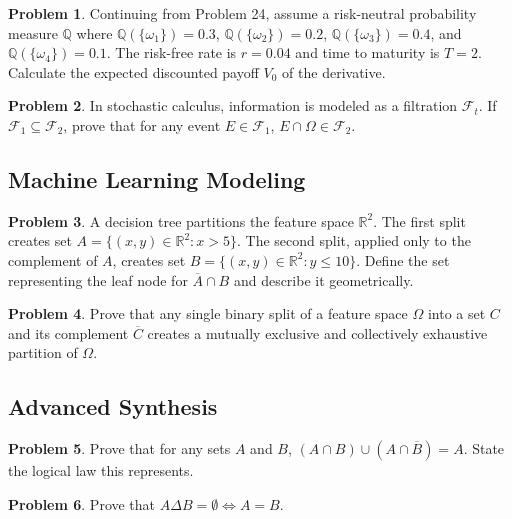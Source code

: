 \documentclass[12pt]{article}
\theoremstyle{definition}
\newtheorem{problem}{Problem}
\begin{document}
\begin{problem}
Continuing from Problem 24, assume a risk-neutral probability measure $\mathbb{Q}$ where $\mathbb{Q}(\{\omega_1\}) = 0.3$, $\mathbb{Q}(\{\omega_2\}) = 0.2$, $\mathbb{Q}(\{\omega_3\}) = 0.4$, and $\mathbb{Q}(\{\omega_4\}) = 0.1$. The risk-free rate is $r = 0.04$ and time to maturity is $T = 2$. Calculate the expected discounted payoff $V_0$ of the derivative.
\end{problem}

\begin{problem}
In stochastic calculus, information is modeled as a filtration $\mathcal{F}_t$. If $\mathcal{F}_1 \subseteq \mathcal{F}_2$, prove that for any event $E \in \mathcal{F}_1$, $E \cap \Omega \in \mathcal{F}_2$.
\end{problem}

\subsection{Machine Learning Modeling}
\begin{problem}
A decision tree partitions the feature space $\mathbb{R}^2$. The first split creates set $A = \{(x,y) \in \mathbb{R}^2 : x > 5\}$. The second split, applied only to the complement of $A$, creates set $B = \{(x,y) \in \mathbb{R}^2 : y \le 10\}$. Define the set representing the leaf node for $\overline{A} \cap B$ and describe it geometrically.
\end{problem}

\begin{problem}
Prove that any single binary split of a feature space $\Omega$ into a set $C$ and its complement $\overline{C}$ creates a mutually exclusive and collectively exhaustive partition of $\Omega$.
\end{problem}

\subsection{Advanced Synthesis}
\begin{problem}
Prove that for any sets $A$ and $B$, $(A \cap B) \cup (A \cap \overline{B}) = A$. State the logical law this represents.
\end{problem}

\begin{problem}
Prove that $A \Delta B = \emptyset \iff A = B$.
\end{problem}

\newpage
\end{document}
